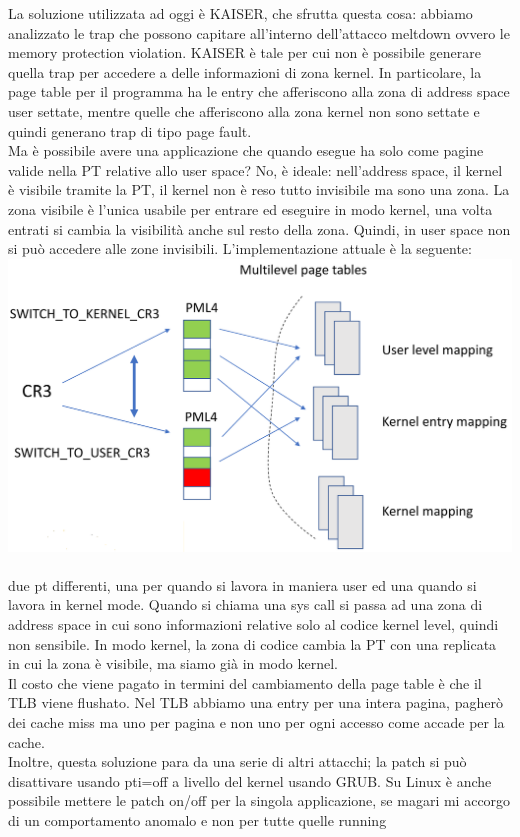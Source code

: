 \documentclass[12pt, oneside]{extbook}
\begin{document}
La soluzione utilizzata ad oggi è KAISER, che sfrutta questa cosa: abbiamo analizzato le trap che possono capitare all'interno dell'attacco meltdown ovvero le memory protection violation. KAISER è tale per cui non è possibile generare quella trap per accedere a delle informazioni di zona kernel. In particolare, la page table per il programma ha le entry che afferiscono alla zona di address space user settate, mentre quelle che afferiscono alla zona kernel non sono settate e quindi generano trap di tipo page fault.\\ Ma è possibile avere una applicazione che quando esegue ha solo come pagine valide nella PT relative allo user space? No, è ideale: nell'address space, il kernel è visibile tramite la PT, il kernel non è reso tutto invisibile ma sono una zona. La zona visibile è l'unica usabile per entrare ed eseguire in modo kernel, una volta entrati si cambia la visibilità anche sul resto della zona. Quindi, in user space non si può accedere alle zone invisibili. L'implementazione attuale è la seguente: \\
\includegraphics[scale=0.3]{immagini/KAISER}\\\\
due pt differenti, una per quando si lavora in maniera user ed una quando si lavora in kernel mode. Quando si chiama una sys call si passa ad una zona di address space in cui sono informazioni relative solo al codice kernel level, quindi non sensibile. In modo kernel, la zona di codice cambia la PT con una replicata in cui la zona è visibile, ma siamo già in modo kernel.\\ Il costo che viene pagato in termini del cambiamento della page table è che il TLB viene flushato. Nel TLB abbiamo una entry per una intera pagina, pagherò dei cache miss ma uno per pagina e non uno per ogni accesso come accade per la cache.\\ Inoltre, questa soluzione para da una serie di altri attacchi; la patch si può disattivare usando \textsf{pti=off} a livello del kernel usando GRUB. Su Linux è anche possibile mettere le patch on/off per la singola applicazione, se magari mi accorgo di un comportamento anomalo e non per tutte quelle running
\end{document}
